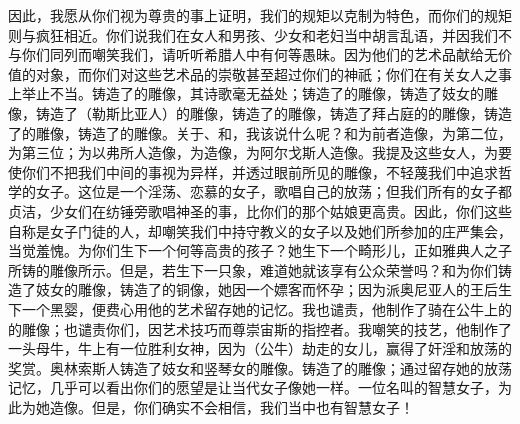 因此，我愿从你们视为尊贵的事上证明，我们的规矩以克制为特色，而你们的规矩则与疯狂相近。你们说我们在女人和男孩、少女和老妇当中胡言乱语，并因我们不与你们同列而嘲笑我们，请听听希腊人中有何等愚昧。因为他们的艺术品献给无价值的对象，而你们对这些艺术品的崇敬甚至超过你们的神祇；你们在有关女人之事上举止不当。铸造了的雕像，其诗歌毫无益处；铸造了的雕像，铸造了妓女的雕像，铸造了（勒斯比亚人）的雕像，铸造了的雕像，铸造了拜占庭的的雕像，铸造了的雕像，铸造了的雕像。关于、和，我该说什么呢？和为前者造像，为第二位，为第三位；为以弗所人造像，为造像，为阿尔戈斯人造像。我提及这些女人，为要使你们不把我们中间的事视为异样，并透过眼前所见的雕像，不轻蔑我们中追求哲学的女子。这位是一个淫荡、恋慕的女子，歌唱自己的放荡；但我们所有的女子都贞洁，少女们在纺锤旁歌唱神圣的事，比你们的那个姑娘更高贵。因此，你们这些自称是女子门徒的人，却嘲笑我们中持守教义的女子以及她们所参加的庄严集会，当觉羞愧。为你们生下一个何等高贵的孩子？她生下一个畸形儿，正如雅典人之子所铸的雕像所示。但是，若生下一只象，难道她就该享有公众荣誉吗？和为你们铸造了妓女的雕像，铸造了的铜像，她因一个嫖客而怀孕；因为派奥尼亚人的王后生下一个黑婴，便费心用他的艺术留存她的记忆。我也谴责，他制作了骑在公牛上的的雕像；也谴责你们，因艺术技巧而尊崇宙斯的指控者。我嘲笑的技艺，他制作了一头母牛，牛上有一位胜利女神，因为（公牛）劫走的女儿，赢得了奸淫和放荡的奖赏。奥林索斯人铸造了妓女和竖琴女的雕像。铸造了的雕像；通过留存她的放荡记忆，几乎可以看出你们的愿望是让当代女子像她一样。一位名叫的智慧女子，为此为她造像。但是，你们确实不会相信，我们当中也有智慧女子！\par


